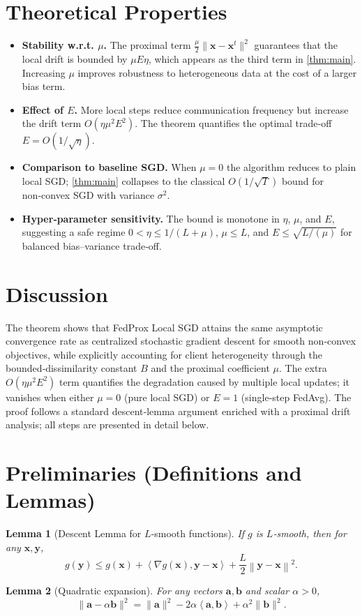 \documentclass{article}
\newtheorem{lemma}{Lemma}
\newcommand{\norm}[1]{\left\lVert #1 \right\rVert}
\newcommand{\inner}[2]{\left\langle #1,#2 \right\rangle}
\begin{document}
\section*{Theoretical Properties}
\begin{itemize}[leftmargin=*]
\item \textbf{Stability w.r.t. $\mu$.}
The proximal term $\frac{\mu}{2}\|\mathbf{x}-\mathbf{x}^{t}\|^{2}$ guarantees that the local drift is bounded by $\mu E\eta$, which appears as the third term in \eqref{thm:main}. Increasing $\mu$ improves robustness to heterogeneous data at the cost of a larger bias term.
\item \textbf{Effect of $E$.}
More local steps reduce communication frequency but increase the drift term $O(\eta\mu^{2}E^{2})$. The theorem quantifies the optimal trade‑off $E=O(1/\sqrt{\eta})$.
\item \textbf{Comparison to baseline SGD.}
When $\mu=0$ the algorithm reduces to plain local SGD; \eqref{thm:main} collapses to the classical $O(1/\sqrt{T})$ bound for non‑convex SGD with variance $\sigma^{2}$.
\item \textbf{Hyper‑parameter sensitivity.}
The bound is monotone in $\eta$, $\mu$, and $E$, suggesting a safe regime
$0<\eta\le 1/(L+\mu)$, $\mu\le L$, and $E\le \sqrt{L/(\mu)}$ for balanced bias–variance trade‑off.
\end{itemize}

\section*{Discussion}
The theorem shows that FedProx Local SGD attains the same asymptotic convergence rate as centralized stochastic gradient descent for smooth non‑convex objectives, while explicitly accounting for client heterogeneity through the bounded‑dissimilarity constant $B$ and the proximal coefficient $\mu$. The extra $O(\eta\mu^{2}E^{2})$ term quantifies the degradation caused by multiple local updates; it vanishes when either $\mu=0$ (pure local SGD) or $E=1$ (single‑step FedAvg). The proof follows a standard descent‑lemma argument enriched with a proximal drift analysis; all steps are presented in detail below.

\section*{Preliminaries (Definitions and Lemmas)}
\begin{lemma}[Descent Lemma for $L$‑smooth functions]\label{lem:descent}
If $g$ is $L$‑smooth, then for any $\mathbf{x},\mathbf{y}$,
\[
g(\mathbf{y})\le g(\mathbf{x})+\inner{\nabla g(\mathbf{x})}{\mathbf{y}-\mathbf{x}}+\frac{L}{2}\norm{\mathbf{y}-\mathbf{x}}^{2}.
\]
\end{lemma}
\begin{lemma}[Quadratic expansion]\label{lem:quad}
For any vectors $\mathbf{a},\mathbf{b}$ and scalar $\alpha>0$,
\[
\|\mathbf{a}-\alpha\mathbf{b}\|^{2}
=\|\mathbf{a}\|^{2}-2\alpha\inner{\mathbf{a}}{\mathbf{b}}+\alpha^{2}\|\mathbf{b}\|^{2}.
\]
\end{lemma}
\end{document}
